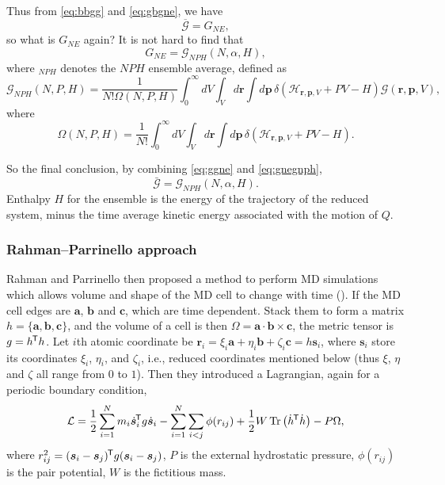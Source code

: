 Thus from \eqref{eq:bbgg} and \eqref{eq:gbgne}, we have
\begin{equation}\label{eq:ggne}
	\overline{\mathscr{G}} = G_{NE},
\end{equation}
so what is $G_{NE}$ again?
It is not hard to find that
\begin{equation}\label{eq:gnegnph}
	G_{NE} = \mathscr{G}_{NPH}(N, \alpha, H),
\end{equation}
where $_{NPH}$ denotes the $NPH$ ensemble average, defined as
\begin{equation}
	\mathscr{G}_{NPH} (N, P, H) = \frac{ 1 }{ N!\Omega(N, P, H) }
	\int_{0}^{\infty} dV \int_{V} d\bm{r} \int d\bm{p}\,
	\delta(\mathcal{H}_{\bm{r}, \bm{p}, V} + P V - H)
	\mathscr{G}(\bm{r}, \bm{p}, V),
\end{equation}
where
\begin{equation}
	\Omega (N, P, H) = \frac{ 1 }{ N! }
	\int_{0}^{\infty} dV \int_{V} d\bm{r} \int d\bm{p}\,
	\delta(\mathcal{H}_{\bm{r}, \bm{p}, V} + P V - H) .
\end{equation}

So the final conclusion, by combining \eqref{eq:ggne} and \eqref{eq:gnegnph},
\begin{equation}
	\bar{\mathscr{G}} = \mathscr{G}_{NPH}(N, \alpha, H).
\end{equation}
Enthalpy $H$ for the ensemble is the energy of the trajectory of the reduced system,
minus the time average kinetic energy associated with the motion of $Q$.


\subsubsection{Rahman--Parrinello approach}
\label{sssec:rpa}

Rahman and Parrinello then proposed a method to perform
MD simulations which allows volume and shape of the MD cell
to change with time (\cite{Parrinello:1980kx}).
If the MD cell edges are $\bm{a}$, $\bm{b}$
and $\bm{c}$, which are time dependent. Stack them to form a
matrix $h = \{ \bm{a}, \bm{b}, \bm{c} \}$, and the volume of a cell
is then $\Omega = \bm{a} \cdot \bm{b} \times \bm{c}$, the metric
tensor is $g = h^{\mkern-1.5mu\mathsf{T}} h$. Let $i$th atomic coordinate be
$\bm{r}_i = \xi_i \bm{a} + \eta_i \bm{b}
	+ \zeta_i \bm{c} = h \bm{s}_i$, where $\bm{s}_i$ store its coordinates
$\xi_i$, $\eta_i$, and $\zeta_i$, i.e., reduced coordinates mentioned below (thus
$\xi$, $\eta$ and $\zeta$ all range from $0$ to $1$).
Then they introduced a Lagrangian, again for a periodic boundary condition,
\begin{equation}\label{eq:rplag}
	\mathcal{L} = \frac{ 1 }{ 2 } \sum_{i=1}^{N} m_i \dot{ \bm{s} }_i ^{\mkern-1.5mu\mathsf{T}}
	g \dot{ \bm{s} }_i - \sum_{i=1}^{N} \sum_{i<j} \phi (r_{ij}) +
	\frac{ 1 }{ 2 } W \Tr \big(\dot{h} ^{\mkern-1.5mu\mathsf{T}} \dot{h} \big) - P \Omega,
\end{equation}
where $r_{ij}^2 = (\bm{s}_i - \bm{s}_j)^{\mkern-1.5mu\mathsf{T}} g (\bm{s}_i - \bm{s}_j)$,
$P$ is the external hydrostatic pressure, $\phi(r_{ij})$ is the pair
potential, $W$ is the fictitious mass.


